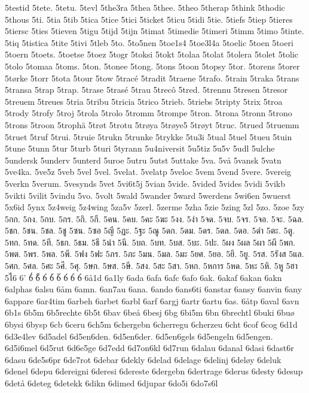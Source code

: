 5testid
5tete.
5tetu.
5tevl
5the3ra
5thea
5thee.
5theo
5therap
5think
5thodic
5thous
5ti.
5tia
5tib
5tica
5tice
5tici
5ticket
5ticu
5tidi
5tie.
5tiefs
5tiep
5tieres
5tiersc
5ties
5tieven
5tigu
5tijd
5tijn
5timat
5timedie
5timeri
5timm
5timo
5tinte.
5tiq
5tistica
5tite
5tivi
5tleb
5to.
5to5nen
5toe1s4
5toe3l4a
5toelic
5toen
5toeri
5toern
5toets.
5toetse
5toez
5togr
5toksi
5tokt
5tolaa
5tolat
5tolera
5tolet
5tolic
5tolo
5tomaa
5toms.
5ton.
5tonee
5tong.
5tons
5toon
5topsy
5tor.
5torens
5torer
5tørke
5torr
5tota
5tour
5tow
5tracé
5tradit
5traene
5trafo.
5train
5traka
5trans
5transa
5trap
5trap.
5trase
5trasé
5trau
5trecô
5tred.
5trennu
5tresen
5tresor
5treuem
5treues
5tria
5tribu
5tricia
5trico
5trieb.
5triebs
5tripty
5trix
5troa
5trody
5trofy
5troj
5trola
5trolo
5tromm
5trompe
5tron.
5trona
5tronn
5trono
5trons
5troon
5trophä
5trøt
5trotu
5trøya
5trøye5
5trøyt
5truc.
5trued
5truemm
5truet
5truf
5trui.
5truie
5trukn
5trunke
5trykke
5tu3i
5tual
5tuel
5tueu
5tuin
5tune
5tunn
5tur
5turb
5turi
5tyrann
5u4niversit
5u5tiz
5u5v
5udl
5ulche
5undersk
5underv
5unterd
5uroe
5utru
5utst
5uttake
5va.
5vå
5vansk
5vatn
5ve4ka.
5ve5z
5veb
5vel
5vel.
5velat.
5velatp
5veloc
5vem
5vend
5vere.
5vereig
5verkn
5verum.
5vesynds
5vet
5vi6t5j
5vian
5vide.
5vided
5vides
5vidi
5vikb
5vikti
5vilit
5vindu
5vo.
5volt
5wald
5wander
5ward
5werdens
5wi6en
5wuerst
5x6id
5ynx
5z4weig
5z4wing
5za5v
5zerl.
5zerme
5zha
5zie
5zing
5zl
5zo.
5zoe
5zy
5กก.
5กง.
5กบ.
5กร.
5กิ.
5กี.
5คน.
5คบ.
5คะ
5ฆะ
5งง.
5งำ
5จด.
5จบ.
5จร.
5จอ.
5จะ.
5ฉล.
5ชก.
5ชน.
5ชล.
5ชู
5ซน.
5ซอ
5ญี
5ฏะ.
5ฐะ
5ณู
5ดก.
5ดม.
5ดร.
5ดล.
5ดอ.
5ดำ
5ตะ.
5ตู.
5ทก.
5ทด.
5ที.
5ธก.
5ธม.
5ธี
5นำ
5นี.
5บถ.
5บท.
5บส.
5บะ.
5ปะ.
5ผง
5ผล
5ผา
5ผี
5พก.
5พต.
5พร.
5พล.
5พี.
5ฟง
5ฟะ
5ภร.
5ภะ
5มน.
5มล.
5มะ
5ยศ.
5ยอ.
5ยี.
5ยู.
5รส.
5รังส
5แล.
5ศก.
5ศล.
5ศะ
5ศี.
5ศุ.
5ษก.
5ษส.
5ษี.
5สง.
5สะ
5สา.
5หก.
5หการ
5หด.
5หะ
5หิ.
5หู
5ฮา
5ไ6
6'
6๎
6็
6่
6้
6๊
6๋
6์
6ํ
6å1d
6a1ly
6ada
6afa
6afc
6afo
6ak.
6akaf
6akan
6akn
6alphas
6alsu
6åm
6amn.
6an7au
6ana.
6ando
6ans6ti
6anstar
6ansy
6anvin
6any
6appare
6ar4tim
6arbeh
6arbet
6arbl
6arf
6argj
6artr
6artu
6as.
6åtp
6aval
6avn
6b1s
6b5m
6b5rechte
6b5t
6bav
6beå
6besj
6bg
6bi5m
6bn
6brechtl
6buki
6buø
6bysi
6bysp
6cb
6ceru
6ch5m
6chergebn
6cherregu
6cherzeu
6cht
6cof
6cog
6d1d
6d3e4lev
6d5adel
6d5en6den.
6d5en6der.
6d5en6gels
6d5engeln
6d5engen.
6d5i6mel
6d5rut
6d6e5ge
6d7edd
6d7on6kl
6d7run
6dalau
6danal
6dasi
6dast6r
6dasu
6de5s6pr
6de7rot
6debar
6dekly
6delad
6delage
6delinj
6deløy
6deluk
6denel
6depu
6dereigni
6deresi
6dereste
6dergebn
6dertrage
6derus
6desty
6desup
6detå
6deteg
6detekk
6dikn
6dimed
6djupar
6do5i
6do7s6l
